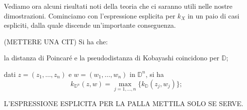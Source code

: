 Vediamo ora alcuni risultati noti della teoria che ci saranno utili nelle nostre dimostrazioni. Cominciamo con l'espressione esplicita per $k_X$ in un paio di casi espliciti, dalla quale discende un'importante conseguenza.

\begin{prop}
    (METTERE UNA CIT) Si ha che:
    \begin{nlist}
        \item la distanza di Poincaré e la pseudodistanza di Kobayashi coincidono per $\mathbb{D}$;
        \item dati $z=(z_1,\dots,z_n)$ e $w=(w_1,\dots,w_n)$ in $\mathbb{D}^n$, si ha
        $$k_{\mathbb{D}^n}(z,w)=\max_{j=1,\dots,n}\{k_{\mathbb{D}}(z_j,w_j)\};$$
        \item L'ESPRESSIONE ESPLICITA PER LA PALLA METTILA SOLO SE SERVE.
    \end{nlist}
\end{prop}
